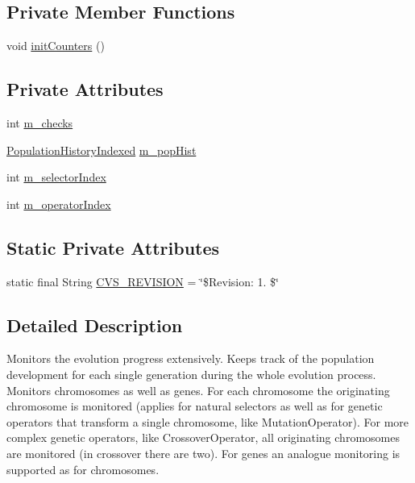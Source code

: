 \subsection*{Private Member Functions}
\begin{DoxyCompactItemize}
\item 
void \hyperlink{classorg_1_1jgap_1_1audit_1_1_evolution_monitor_aa99d32c8025a4a78476c585c25018269}{init\-Counters} ()
\end{DoxyCompactItemize}
\subsection*{Private Attributes}
\begin{DoxyCompactItemize}
\item 
int \hyperlink{classorg_1_1jgap_1_1audit_1_1_evolution_monitor_aff60d0ebb1c8b61abd2d4161bf80e907}{m\-\_\-checks}
\item 
\hyperlink{classorg_1_1jgap_1_1eval_1_1_population_history_indexed}{Population\-History\-Indexed} \hyperlink{classorg_1_1jgap_1_1audit_1_1_evolution_monitor_a909b9c70b78843ab34ab1f98cc19dd8c}{m\-\_\-pop\-Hist}
\item 
int \hyperlink{classorg_1_1jgap_1_1audit_1_1_evolution_monitor_af91128db503b0f3dfe34e59840ba7b8a}{m\-\_\-selector\-Index}
\item 
int \hyperlink{classorg_1_1jgap_1_1audit_1_1_evolution_monitor_a8d6fb9bbfa6ef0f1347b952482518d2a}{m\-\_\-operator\-Index}
\end{DoxyCompactItemize}
\subsection*{Static Private Attributes}
\begin{DoxyCompactItemize}
\item 
static final String \hyperlink{classorg_1_1jgap_1_1audit_1_1_evolution_monitor_a8cfabc5fab0da208643c17cf92b79e10}{C\-V\-S\-\_\-\-R\-E\-V\-I\-S\-I\-O\-N} = \char`\"{}\$Revision\-: 1. \$\char`\"{}
\end{DoxyCompactItemize}


\subsection{Detailed Description}
Monitors the evolution progress extensively. Keeps track of the population development for each single generation during the whole evolution process. Monitors chromosomes as well as genes. For each chromosome the originating chromosome is monitored (applies for natural selectors as well as for genetic operators that transform a single chromosome, like Mutation\-Operator). For more complex genetic operators, like Crossover\-Operator, all originating chromosomes are monitored (in crossover there are two). For genes an analogue monitoring is supported as for chromosomes.


